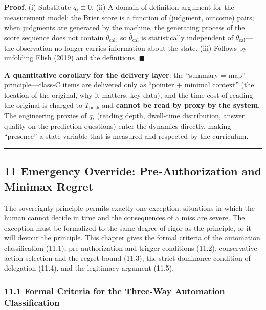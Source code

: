 \documentclass[
  11pt]{article}
\begin{document}
\textbf{Proof}. (i) Substitute \(q_t \equiv 0\). (ii) A
domain-of-definition argument for the measurement model: the Brier score
is a function of (judgment, outcome) pairs; when judgments are generated
by the machine, the generating process of the score sequence does not
contain \(\theta_{\mathrm{cal}}\), so \(\hat\theta_{\mathrm{cal}}\) is
statistically independent of \(\theta_{\mathrm{cal}}\)---the observation
no longer carries information about the state. (iii) Follows by
unfolding Elish (2019) and the definitions. \(\blacksquare\)

\textbf{A quantitative corollary for the delivery layer}: the ``summary
= map'' principle---class-C items are delivered only as ``pointer +
minimal context'' (the location of the original, why it matters, key
data), and the time cost of reading the original is charged to
\(T_{\mathrm{push}}\) and \textbf{cannot be read by proxy by the
system}. The engineering proxies of \(q_t\) (reading depth, dwell-time
distribution, answer quality on the prediction questions) enter the
dynamics directly, making ``presence'' a state variable that is measured
and respected by the curriculum.

\begin{center}\rule{0.5\linewidth}{0.5pt}\end{center}

\subsection{11 Emergency Override: Pre-Authorization and Minimax
Regret}\label{emergency-override-pre-authorization-and-minimax-regret}

The sovereignty principle permits exactly one exception: situations in
which the human cannot decide in time and the consequences of a miss are
severe. The exception must be formalized to the same degree of rigor as
the principle, or it will devour the principle. This chapter gives the
formal criteria of the automation classification (11.1),
pre-authorization and trigger conditions (11.2), conservative action
selection and the regret bound (11.3), the strict-dominance condition of
delegation (11.4), and the legitimacy argument (11.5).

\subsubsection{11.1 Formal Criteria for the Three-Way Automation
Classification}\label{formal-criteria-for-the-three-way-automation-classification}
\end{document}
